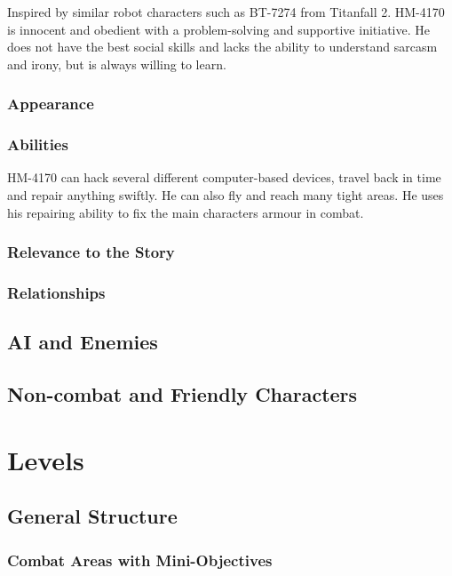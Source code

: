 \documentclass[12pt]{article}
\begin{document}
Inspired by similar robot characters such as BT-7274 from Titanfall 2. HM-4170 is innocent and obedient with a problem-solving and supportive initiative. He does not have the best social skills and lacks the ability to understand sarcasm and irony, but is always willing to learn.

\subsubsection{Appearance}

\subsubsection{Abilities}

HM-4170 can hack several different computer-based devices, travel back in time and repair anything swiftly. He can also fly and reach many tight areas. He uses his repairing ability to fix the main characters armour in combat. 

\subsubsection{Relevance to the Story}

\subsubsection{Relationships}

\subsection{AI and Enemies}

\subsection{Non-combat and Friendly Characters}

\section{Levels}

\subsection{General Structure}

\subsubsection{Combat Areas with Mini-Objectives}
\end{document}

